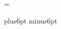 \def\saveif#1{%
	\def\@saveiftrue{\defer{\let#1=\iftrue}}%
	\def\@saveiffalse{\defer{\let#1=\iffalse}}%
	#1\@saveiftrue\else\@saveiffalse\fi}

\def\ascend#1={\def\@ascend{\savethe{#1}}\afterassignment\@ascend#1=}




\parindent=0pt
\parskip=\smallskipamount

\newdimen\prob@sidesize \prob@sidesize=20pt
\newdimen\prob@rulegap  \prob@rulegap=5pt
\newskip\prob@topskip   \prob@topskip=16pt plus6pt minus6pt

\newcount\@count   \newcount\@@count
\newskip\@skip     \newskip\@@skip
\newmuskip\@muskip \newmuskip\@@muskip
\newdimen\@dimen   \newdimen\@@dimen
\newbox\@box       \newbox\@@box



% 
% 

